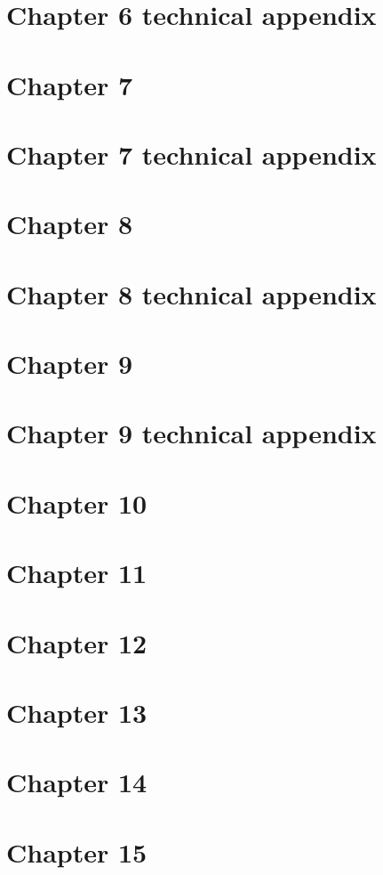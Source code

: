 \documentclass[10pt]{article}
\begin{document}
  \newpage
  \section*{Chapter 6 technical appendix}
  
  
  \newpage
  \section*{Chapter 7}
  
  
  \newpage
  \section*{Chapter 7 technical appendix}
  
  
  \newpage
  \section*{Chapter 8}
  
  
  \newpage
  \section*{Chapter 8 technical appendix}
  
  
  \newpage
  \section*{Chapter 9}
  
  
  \newpage
  \section*{Chapter 9 technical appendix}
  
  
  \newpage
  \section*{Chapter 10}
  
  
  \newpage
  \section*{Chapter 11}
  
	  
  \newpage
  \section*{Chapter 12}
  
  
  \newpage
  \section*{Chapter 13}
  
  
  \newpage
  \section*{Chapter 14}
  
  
  \newpage
  \section*{Chapter 15}
  
\end{document}
